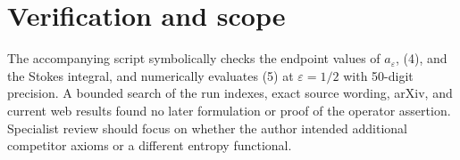 \documentclass[11pt]{article}
\begin{document}
\section*{Verification and scope}
The accompanying script symbolically checks the endpoint values of
$a_\varepsilon$, (4), and the Stokes integral, and numerically evaluates (5)
at $\varepsilon=1/2$ with 50-digit precision.  A bounded search of the run
indexes, exact source wording, arXiv, and current web results found no later
formulation or proof of the operator assertion.  Specialist review should
focus on whether the author intended additional competitor axioms or a
different entropy functional.
\end{document}
